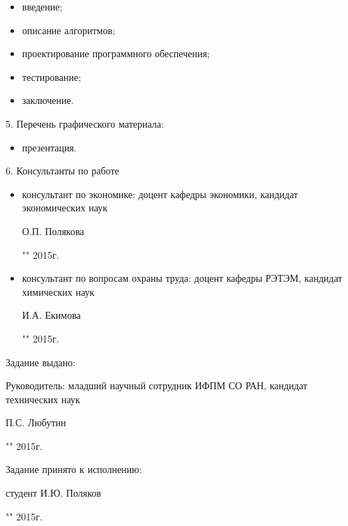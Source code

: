 \begin{itemize}
 \item введение;
 \item описание алгоритмов;
 \item проектирование программного обеспечения;
 \item тестирование;
 \item заключение.
\end{itemize}

5. Перечень графического материала:

\begin{itemize}
 \item презентация.
\end{itemize}

6. Консультанты по работе

\begin{itemize}
  \item консультант по экономике: доцент кафедры экономики, кандидат \\ экономических наук \\
  \begin{singlespace}
 О.П. Полякова\hfill \underline{\hspace{6cm}} \\
 \begin{flushright} "\underline{\hspace{1cm}}"\underline{\hspace{3cm}} 2015г. \end{flushright}
 \end{singlespace}
 \item консультант по вопросам охраны труда: доцент кафедры РЭТЭМ, кандидат химических наук\\
 \begin{singlespace}
 И.А. Екимова \hfill \underline{\hspace{6cm}} \\
 \begin{flushright} "\underline{\hspace{1cm}}"\underline{\hspace{3cm}} 2015г. \end{flushright}
 \end{singlespace}
\end{itemize}

Задание выдано:

Руководитель: младший научный сотрудник ИФПМ СО РАН, кандидат технических наук \\
\begin{singlespace}
П.С. Любутин \hfill \underline{\hspace{6cm}} \\
\begin{flushright} "\underline{\hspace{1cm}}"\underline{\hspace{3cm}} 2015г. \end{flushright}
\end{singlespace}

Задание принято к исполнению:

\begin{singlespace}
студент И.Ю. Поляков \hfill \underline{\hspace{6cm}} \\
\begin{flushright} "\underline{\hspace{1cm}}"\underline{\hspace{3cm}} 2015г. \end{flushright}
\end{singlespace}